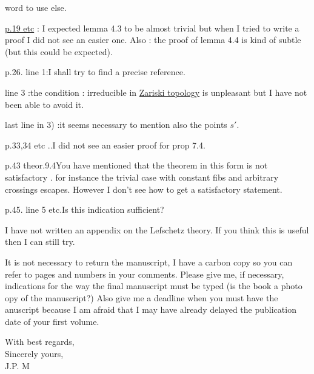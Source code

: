 word to use else.

\uline{p.19 etc}\margin{!} : I expected lemma 4.3 to be almost trivial but when I tried to write a proof I did not see an easier one. Also : the proof of lemma 4.4 is kind of subtle (but this could be expected).

p.26. line 1:\quad I shall try to find a precise reference.

line 3 :\quad the condition : irreducible in \uline{Zariski topology} is unpleasant but I have not been able to avoid it.

last line in 3) :\quad it seems necessary to mention also the points $s'$.

p.33,34 etc ..\quad I did not see an easier proof for prop 7.4.

p.43 theor.9.4\quad You have mentioned that the theorem in this form is not satisfactory . for instance the trivial case with constant fibs and arbitrary crossings escapes. However I don't see how to get a satisfactory statement.

p.45. line 5 etc.\quad Is this indication sufficient?

I have not written an appendix on the Lefschetz theory. If you think this is useful then I can still try.

It is not necessary to return the manuscript, I have a carbon copy so you can refer to pages and numbers in your comments. Please give me, if necessary, indications for the way the final manuscript must be typed (is the book a  photo opy of the manuscript?) Also give me a deadline when you must have the anuscript because I am afraid that I may have already delayed the publication date of your first volume.

With best regards,\\
Sincerely yours,\\
J.P. M\\
